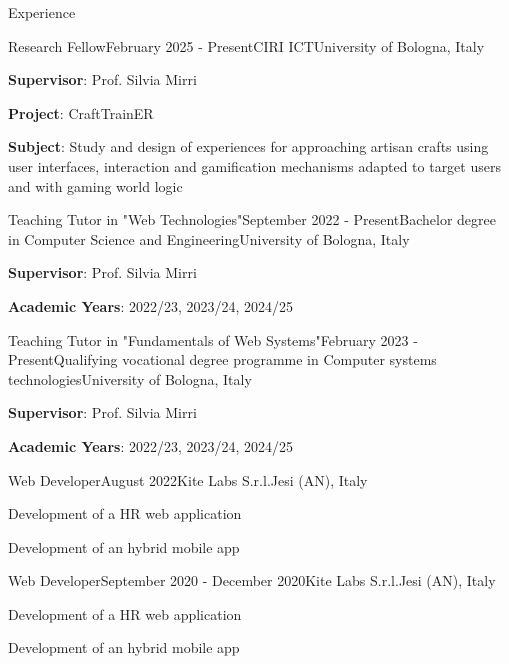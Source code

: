 \documentclass[
	11pt, %
]{resume} %
\begin{document}
\begin{rSection}{Experience}

    \begin{rSubsection}{Research Fellow}{February 2025 - Present}{CIRI ICT}{University of Bologna, Italy}
        \item \textbf{Supervisor}: Prof. Silvia Mirri
        \item \textbf{Project}: CraftTrainER
        \item \textbf{Subject}: Study and design of experiences for approaching artisan crafts using user interfaces, 
        interaction and gamification mechanisms adapted to target users and with gaming world logic
    \end{rSubsection}
    
    \begin{rSubsection}{Teaching Tutor in "Web Technologies"}{September 2022 - Present}{Bachelor degree in Computer Science and Engineering}{University of Bologna, Italy}
        \item \textbf{Supervisor}: Prof. Silvia Mirri
        \item \textbf{Academic Years}: 2022/23, 2023/24, 2024/25
    \end{rSubsection}

    \begin{rSubsection}{Teaching Tutor in "Fundamentals of Web Systems"}{February 2023 - Present}{Qualifying vocational degree programme in Computer systems technologies}{University of Bologna, Italy}
        \item \textbf{Supervisor}: Prof. Silvia Mirri
        \item \textbf{Academic Years}: 2022/23, 2023/24, 2024/25
    \end{rSubsection}

    \begin{rSubsection}{Web Developer}{August 2022}{Kite Labs S.r.l.}{Jesi (AN), Italy}
	\item Development of a HR web application
        \item Development of an hybrid mobile app
    \end{rSubsection}

    \begin{rSubsection}{Web Developer}{September 2020 - December 2020}{Kite Labs S.r.l.}{Jesi (AN), Italy}
	\item Development of a HR web application
        \item Development of an hybrid mobile app
    \end{rSubsection}


\end{rSection}
\end{document}
